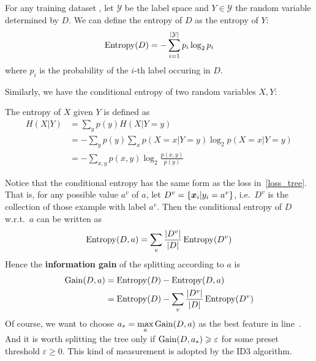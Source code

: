 For any training dataset \dataset, let $\mathcal{Y}$ be the label space and $Y \in \mathcal{Y}$ the random
variable determined by $D$.
We can define the entropy of $D$ as the entropy of $Y$:
\begin{equation}
    \operatorname{Entropy}(D) = - \sum_{i=1}^{|\mathcal{Y}|}p_i\log_2 p_i
\end{equation}
where $p_i$ is the probability of the $i$-th label occuring in $D$.

Similarly, we have the conditional entropy of two random variables $X, Y$:
\begin{df}
    The entropy of $X$ given $Y$ is defined as
    \begin{equation}
        \begin{split}
        H(X | Y) &= \sum_{y} p(y) H(X | Y=y)\\
                 &= - \sum_{y}p(y) \sum_{x} p(X=x | Y=y)\log_2 p(X=x | Y=y)\\
                 &= -\sum_{x, y} p(x, y)\log_2 \frac{p(x, y)}{p(y)}
        \end{split}
    \end{equation}
\end{df}

Notice that the conditional entropy has the same form as the loss in~\eqref{loss_tree}.
That is, for any possible value $a^v$ of $a$, let
$D^v = \{\boldsymbol{x}_i | y_i = a^v\}$, i.e.\ $D^v$ is the collection of those example with label $a^v$. Then the
conditional entropy of $D$ w.r.t.\ $a$ can be written as
\begin{equation}
    \operatorname{Entropy}(D, a) = \sum_{v} \frac{|D^v|}{|D|}\operatorname{Entropy}(D^v)
\end{equation}
Hence the \textbf{information gain} of the splitting according to $a$ is
\begin{equation}
    \begin{split}
    \operatorname{Gain}(D, a) &= \operatorname{Entropy}(D) - \operatorname{Entropy}(D, a)\\
                &= \operatorname{Entropy}(D) - \sum_{v} \frac{|D^v|}{|D|}\operatorname{Entropy}(D^v)
    \end{split}
\end{equation}
Of course, we want to choose $\displaystyle a_* = \max_a \operatorname{Gain}(D, a)$ as the best feature in 
line~. And it is worth splitting the tree only if 
$\operatorname{Gain}(D, a_*) \geqslant \varepsilon$
for some preset threshold $\varepsilon \geqslant 0$. This kind of measurement is adopted by the ID3 algorithm.

